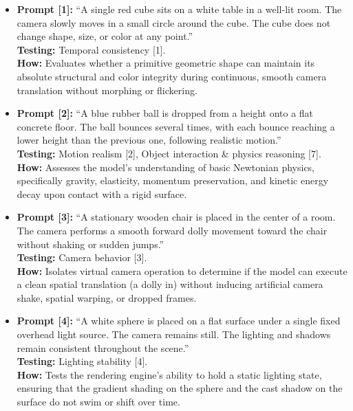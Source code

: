 \documentclass[sigconf]{acmart}
\begin{document}
\begin{itemize}
    \item \textbf{Prompt [1]:} ``A single red cube sits on a white table in a well-lit room. The camera slowly moves in a small circle around the cube. The cube does not change shape, size, or color at any point.''
          \\ \textbf{Testing:} Temporal consistency [1].
          \\ \textbf{How:} Evaluates whether a primitive geometric shape can maintain its absolute structural and color integrity during continuous, smooth camera translation without morphing or flickering.



    \item \textbf{Prompt [2]:} ``A blue rubber ball is dropped from a height onto a flat concrete floor. The ball bounces several times, with each bounce reaching a lower height than the previous one, following realistic motion.''
          \\ \textbf{Testing:} Motion realism [2], Object interaction \& physics reasoning [7].
          \\ \textbf{How:} Assesses the model's understanding of basic Newtonian physics, specifically gravity, elasticity, momentum preservation, and kinetic energy decay upon contact with a rigid surface.



    \item \textbf{Prompt [3]:} ``A stationary wooden chair is placed in the center of a room. The camera performs a smooth forward dolly movement toward the chair without shaking or sudden jumps.''
          \\ \textbf{Testing:} Camera behavior [3].
          \\ \textbf{How:} Isolates virtual camera operation to determine if the model can execute a clean spatial translation (a dolly in) without inducing artificial camera shake, spatial warping, or dropped frames.

    \item \textbf{Prompt [4]:} ``A white sphere is placed on a flat surface under a single fixed overhead light source. The camera remains still. The lighting and shadows remain consistent throughout the scene.''
          \\ \textbf{Testing:} Lighting stability [4].
          \\ \textbf{How:} Tests the rendering engine's ability to hold a static lighting state, ensuring that the gradient shading on the sphere and the cast shadow on the surface do not swim or shift over time.


\end{itemize}
\end{document}
